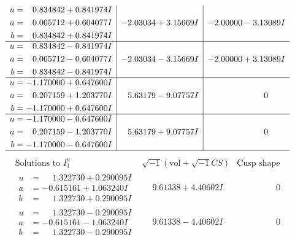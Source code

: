 \documentclass[1p]{elsarticle_modified}
\theoremstyle{definition}
\newcommand{\I}{\sqrt{-1}}
\begin{document}
$$\begin{array}{c|c|c}
\begin{aligned}
u &= \phantom{-}0.834842 + 0.841974 I \\
a &= \phantom{-}0.065712 + 0.604077 I \\
b &= \phantom{-}0.834842 + 0.841974 I\end{aligned}
 & -2.03034 + 3.15669 I & -2.00000 - 3.13089 I \\ \hline\begin{aligned}
u &= \phantom{-}0.834842 - 0.841974 I \\
a &= \phantom{-}0.065712 - 0.604077 I \\
b &= \phantom{-}0.834842 - 0.841974 I\end{aligned}
 & -2.03034 - 3.15669 I & -2.00000 + 3.13089 I \\ \hline\begin{aligned}
u &= -1.170000 + 0.647600 I \\
a &= \phantom{-}0.207159 + 1.203770 I \\
b &= -1.170000 + 0.647600 I\end{aligned}
 & \phantom{-}5.63179 - 9.07757 I & \phantom{-0.000000 } 0 \\ \hline\begin{aligned}
u &= -1.170000 - 0.647600 I \\
a &= \phantom{-}0.207159 - 1.203770 I \\
b &= -1.170000 - 0.647600 I\end{aligned}
 & \phantom{-}5.63179 + 9.07757 I & \phantom{-0.000000 } 0\\
 \hline 
 \end{array}$$\newpage$$\begin{array}{c|c|c}  
\text{Solutions to }I^u_{1}& \I (\text{vol} + \sqrt{-1}CS) & \text{Cusp shape}\\
 \hline 
\begin{aligned}
u &= \phantom{-}1.322730 + 0.290095 I \\
a &= -0.615161 + 1.063240 I \\
b &= \phantom{-}1.322730 + 0.290095 I\end{aligned}
 & \phantom{-}9.61338 + 4.40602 I & \phantom{-0.000000 } 0 \\ \hline\begin{aligned}
u &= \phantom{-}1.322730 - 0.290095 I \\
a &= -0.615161 - 1.063240 I \\
b &= \phantom{-}1.322730 - 0.290095 I\end{aligned}
 & \phantom{-}9.61338 - 4.40602 I & \phantom{-0.000000 } 0 \\ \hline\begin{aligned}

\end{aligned}
\end{array}$$
\end{document}

